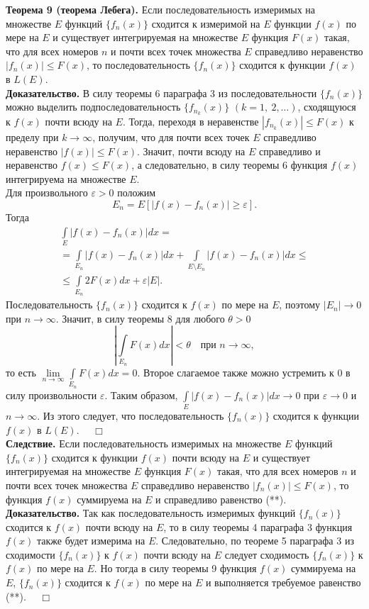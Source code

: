 \documentclass[12pt,a4paper, titlepage]{article}
\begin{document}
\textbf{Теорема 9 (теорема Лебега).} Если последовательность измеримых на множестве $E$ функций $\lbrace f_n(x) \rbrace$ сходится к измеримой на $E$ функции $f(x)$ по мере на $E$ и существует интегрируемая на множестве $E$ функция $F(x)$ такая, что для всех номеров $n$ и почти всех точек множества $E$ справедливо неравенство $|f_n(x)| \leqslant F(x)$, то последовательность $\lbrace f_n(x) \rbrace$ сходится к функции $f(x)$ в $L(E)$.\\
\textbf{Доказательство.}
В силу теоремы 6 параграфа 3 из последовательности $\lbrace f_n(x) \rbrace$ можно выделить подпоследовательность $\lbrace f_{n_k}(x) \rbrace$ $( k = 1, \ 2, \dots)$, сходящуюся к $f(x)$ почти всюду на $E$. Тогда, переходя в неравенстве $|f_{n_k}(x)| \leqslant F(x)$ к пределу при $k \to \infty$, получим, что для почти всех точек $E$ справедливо неравенство $|f(x)| \leqslant F(x)$. Значит, почти всюду на $E$ справедливо и неравенство $f(x) \leqslant F(x)$, а следовательно, в силу теоремы 6 функция $f(x)$ интегрируема на множестве $E$.\\

Для произвольного $\varepsilon > 0$ положим
$$
E_n =  E[|f(x) - f_n(x)| \geqslant \varepsilon].
$$
Тогда
\begin{multline*}
\int\limits_E |f(x) - f_n(x)| dx = \\
= \int\limits_{E_n} |f(x) - f_n(x)| dx + \int\limits_{E \setminus E_n} |f(x) - f_n(x)| dx \leqslant \\
\leqslant \int\limits_{E_n} 2F(x) dx + \varepsilon |E|.
\end{multline*}
Последовательность $\lbrace f_n(x) \rbrace$ сходится к $f(x)$ по мере на $E$, поэтому $|E_n| \to 0$ при $n \to \infty$. Значит, в силу теоремы 8 для любого $\theta > 0$
$$
\left| \int\limits_{E_n} F(x) dx \right| < \theta \quad \mbox{при } n \to \infty,
$$
то есть $\lim\limits_{n \to \infty} \int\limits_{E_n} F(x) dx = 0$. Второе слагаемое также можно устремить к 0 в силу произвольности $\varepsilon$. Таким образом, $\int\limits_E |f(x) - f_n(x)| dx \to 0$ при $\varepsilon \to 0$ и $n \to \infty$. Из этого следует, что последовательность $\lbrace f_n(x) \rbrace$ сходится к функции $f(x)$ в $L(E)$. $\quad \Box$\\

\textbf{Следствие.} Если последовательность измеримых на множестве $E$ функций $\lbrace f_n(x) \rbrace$ сходится к функции $f(x)$ почти всюду на $E$ и существует интегрируемая на множестве $E$ функция $F(x)$ такая, что для всех номеров $n$ и почти всех точек множества $E$ справедливо неравенство $|f_n(x)| \leqslant F(x)$, то функция $f(x)$ суммируема на $E$ и справедливо равенство (**).\\
\textbf{Доказательство.}
Так как последовательность измеримых функций $\lbrace f_n(x) \rbrace$ сходится к $f(x)$ почти всюду на $E$, то в силу теоремы 4 параграфа 3 функция $f(x)$ также будет измерима на $E$. Следовательно, по теореме 5 параграфа 3 из сходимости $\lbrace f_n(x) \rbrace$ к $f(x)$ почти всюду на $E$ следует сходимость $\lbrace f_n(x) \rbrace$ к $f(x)$ по мере на $E$. Но тогда в силу теоремы 9 функция $f(x)$ суммируема на $E$, $\lbrace f_n(x) \rbrace$ сходится к $f(x)$ по мере на $E$ и выполняется требуемое равенство (**). $\quad \Box$\\
\end{document}
